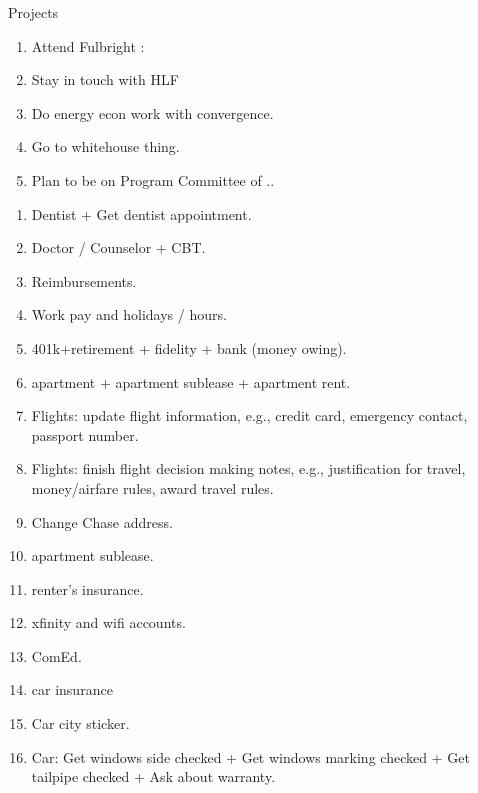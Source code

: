 \begin{block}{Projects}
\begin{enumerate}
\item \tiny Attend Fulbright : 
\item \tiny Stay in touch with HLF 
\item \tiny Do energy econ work with convergence. 
\item \tiny Go to whitehouse thing. 
\item \tiny Plan to be on Program Committee of .. 
\end{enumerate}
\begin{enumerate}
\tiny \item \tiny Dentist + Get dentist appointment.
\item \tiny Doctor / Counselor + CBT.
\item \tiny Reimbursements.
\item \tiny Work pay and holidays / hours. 
\item \tiny 401k+retirement  + fidelity + bank (money owing). 
\item \tiny apartment + apartment sublease + apartment rent.
\item \tiny Flights: update flight information, e.g., credit card,
  emergency contact, passport number.
\item \tiny Flights: finish flight decision making notes, e.g.,
  justification for travel, money/airfare rules, award travel rules.
\item \tiny Change Chase address. 
\item \tiny apartment sublease. 
\item \tiny renter's insurance. 
\item \tiny xfinity and wifi accounts. 
\item \tiny ComEd. 
\item \tiny car insurance  
\item \tiny Car city sticker. 
\item \tiny Car: Get windows side checked + Get windows marking checked + Get tailpipe checked + Ask about warranty. 
\end{enumerate}


\end{block}

